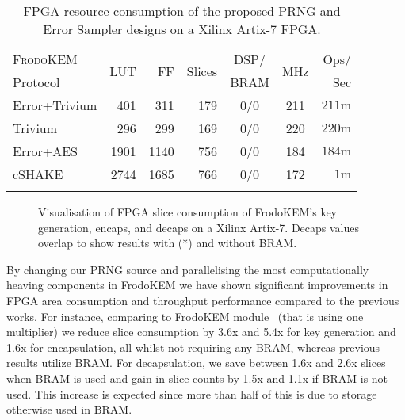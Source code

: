 \begin{table}[!t]
\centering
\caption{FPGA resource consumption of the proposed PRNG and Error Sampler designs on a Xilinx Artix-7 FPGA.}\label{tab:otherresults}
\begin{tabular}{l r r r c c r}
\hline \Tstrut
  \textsc{FrodoKEM} & \multirow{2}{*}{LUT} & \multirow{2}{*}{FF} & \multirow{2}{*}{Slices} & DSP/ & \multirow{2}{*}{MHz} & Ops/ \\
Protocol &&&& BRAM && Sec  \\ \hline \Tstrut

Error+Trivium & 401 & 311 & 179 & 0/0 & 211 & $211\text{m}$ \\
Trivium & 296 & 299 & 169 & 0/0 & 220 & $220\text{m}$ \\ \hline \Tstrut

Error+AES \cite{howe2018standard} & 1901 & 1140 & 756 & 0/0 & 184 & $184\text{m}$ \\
cSHAKE \cite{howe2018standard} & 2744 & 1685 & 766 & 0/0 & 172 & $1\text{m}$ \\ \hline \Tstrut

\end{tabular}%
\end{table}

\begin{figure}[h]
\centering
\resizebox{0.4\textwidth}{!}{%

}
\caption{Visualisation of FPGA slice consumption of FrodoKEM's key generation, encaps, and decaps on a Xilinx Artix-7. Decaps values overlap to show results with (*) and without BRAM.}
\label{fig:hw}
\end{figure}

By changing our PRNG source and parallelising the most computationally heaving components in FrodoKEM we have shown significant improvements in FPGA area consumption and throughput performance compared to the previous works. For instance, comparing to FrodoKEM module~\cite{howe2018standard} (that is using one multiplier) we reduce slice consumption by 3.6x and 5.4x for key generation and 1.6x for encapsulation, all whilst not requiring any BRAM, whereas previous results utilize BRAM. For decapsulation, we save between 1.6x and 2.6x slices when BRAM is used and gain in slice counts by 1.5x and 1.1x if BRAM is not used. This increase is expected since more than half of this is due to storage otherwise used in BRAM.

